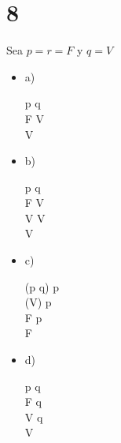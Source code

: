 \documentclass[12pt, fleqn]{article}                            %
\def \Eq {equation}                                             %
\newenvironment{MultiLineEquation*}[1]                          %
        {\begin{\Eq*}\begin{alignedat}{#1}}                         %
        {\end{alignedat}\end{\Eq*}}                                 %
\theoremstyle{break}                                            %
\begin{document}
\clearpage
\section{8}   

\begin{multicols}{2}


    Sea $p = r = F$ y $q = V$     

    \begin{itemize}
        
        \item a)
            \begin{MultiLineEquation*}{3}
                p \vee q                               \\
                F \vee V                                \\
                V
            \end{MultiLineEquation*}


        \item b)
            \begin{MultiLineEquation*}{3}
                \neg p \vee q                               \\
                \neg F \vee V                                \\
                V \vee V                                \\
                V
            \end{MultiLineEquation*}

        \item c)
            \begin{MultiLineEquation*}{3}
                \neg (p \vee q) \wedge \neg p               \\
                \neg (V) \wedge \neg p               \\
                F \wedge \neg p               \\
                F
            \end{MultiLineEquation*}

        \item d)
            \begin{MultiLineEquation*}{3}
                \neg p \vee \neg q                               \\
                \neg F \vee \neg q                                \\
                V \vee \neg q                                \\
                V
            \end{MultiLineEquation*}


\end{itemize}
\end{multicols}
\end{document}
